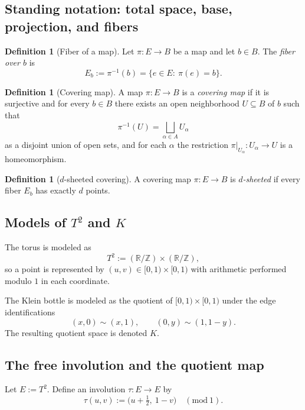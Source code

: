 \documentclass[11pt,a4paper]{article}
\theoremstyle{definition}
\newtheorem{definition}[theorem]{Definition}
\theoremstyle{remark}
\begin{document}
\subsection{Standing notation: total space, base, projection, and fibers}
\label{sec:standing-notation}

\begin{definition}[Fiber of a map]
\label{def:fiber}
Let \(\pi:E\to B\) be a map and let \(b\in B\). The \emph{fiber over \(b\)} is
\[
E_b := \pi^{-1}(b)=\{e\in E:\ \pi(e)=b\}.
\]
\end{definition}

\begin{definition}[Covering map]
\label{def:covering}
A map \(\pi:E\to B\) is a \emph{covering map} if it is surjective and for every \(b\in B\) there exists an open neighborhood \(U\subseteq B\) of \(b\) such that
\[
\pi^{-1}(U)=\bigsqcup_{\alpha\in A} U_\alpha
\]
as a disjoint union of open sets, and for each \(\alpha\) the restriction \(\pi|_{U_\alpha}:U_\alpha\to U\) is a homeomorphism.
\end{definition}

\begin{definition}[\(d\)-sheeted covering]
\label{def:d-sheeted}
A covering map \(\pi:E\to B\) is \emph{\(d\)-sheeted} if every fiber \(E_b\) has exactly \(d\) points.
\end{definition}

\subsection{Models of \(T^2\) and \(K\)}
\label{sec:models}

The torus is modeled as
\[
T^2 := (\mathbb{R}/\mathbb{Z})\times(\mathbb{R}/\mathbb{Z}),
\]
so a point is represented by \((u,v)\in[0,1)\times[0,1)\) with arithmetic performed modulo \(1\) in each coordinate.

The Klein bottle is modeled as the quotient of \([0,1)\times[0,1)\) under the edge identifications
\[
(x,0)\sim(x,1),
\qquad
(0,y)\sim(1,1-y).
\]
The resulting quotient space is denoted \(K\).

\subsection{The free involution and the quotient map}
\label{sec:involution-quotient}

Let \(E:=T^2\). Define an involution \(\tau:E\to E\) by
\[
\tau(u,v) := \bigl(u+\tfrac12,\ 1-v\bigr)\quad (\mathrm{mod}\ 1).
\]
\end{document}
